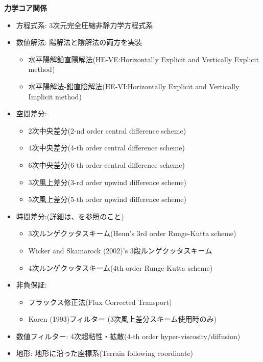 {\bf 力学コア関係}
\begin{itemize}
 \item 方程式系: 3次元完全圧縮非静力学方程式系
 \item 数値解法: 陽解法と陰解法の両方を実装
   \begin{itemize}
    \item 水平陽解鉛直陽解法(HE-VE:Horizontally Explicit and Vertically Explicit method)
    \item 水平陽解法-鉛直陰解法(HE-VI:Horizontally Explicit and Vertically Implicit method)
   \end{itemize}
 \item 空間差分:
    \begin{itemize}
      \item 2次中央差分(2-nd order central difference scheme)
      \item 4次中央差分(4-th order central difference scheme)
      \item 6次中央差分(6-th order central difference scheme)
      \item 3次風上差分(3-rd order upwind difference scheme)
      \item 5次風上差分(5-th order upwind difference scheme)
    \end{itemize}
 \item 時間差分:(詳細は、\citet{scale_2015}を参照のこと)
    \begin{itemize}
      \item 3次ルンゲクッタスキーム(Heun's 3rd order Runge-Kutta scheme)
      \item Wicker and Skamarock (2002)'s 3段ルンゲクッタスキーム \citep[3-step Runge-Kutta scheme of ][]{Wicker_2002}
      \item 4次ルンゲクッタスキーム(4th order Runge-Kutta scheme)
    \end{itemize}
 \item 非負保証:
    \begin{itemize}
      \item フラックス修正法(Flux Corrected Transport)
      \item Koren (1993)フィルター \citep{Koren_1993} (3次風上差分スキーム使用時のみ)
    \end{itemize}
 \item 数値フィルター: 4次超粘性・拡散(4-th order hyper-viscosity/diffusion)
 \item 地形: 地形に沿った座標系(Terrain following coordinate)
\end{itemize}


